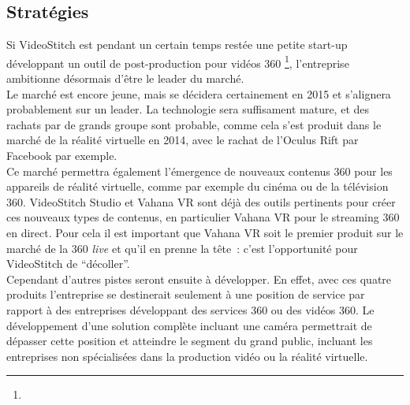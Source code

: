 \subsection{Stratégies}
Si VideoStitch est pendant un certain temps restée une petite start-up développant
un outil de post-production pour vidéos 360 \footnote{}, 
l'entreprise ambitionne désormais d'être le leader du marché.\\
Le marché est encore jeune, mais se décidera certainement en 2015 et s'alignera
probablement sur un leader. La technologie sera suffisament mature, et des rachats
par de grands groupe sont probable, comme cela s'est produit dans le marché de la
réalité virtuelle en 2014, avec le rachat de l'Oculus Rift par Facebook 
\cite{facebook-vr} par exemple.\\
Ce marché permettra également l'émergence de nouveaux contenus 360 pour les appareils
de réalité virtuelle, comme par exemple du cinéma ou de la télévision 360.
VideoStitch Studio et Vahana VR sont déjà des outils pertinents pour créer ces 
nouveaux types de contenus, en particulier Vahana VR pour le streaming 360 en direct.
Pour cela il est important que Vahana VR soit le premier produit sur le marché
de la 360 \textit{live} et qu'il en prenne la tête~: c'est l'opportunité pour VideoStitch
de \enquote{décoller}.\\
\newline
Cependant d'autres pistes seront ensuite à développer. En effet, avec ces quatre produits
l'entreprise se destinerait seulement à une position de service par rapport à des 
entreprises développant des services 360 ou des vidéos 360. Le développement d'une solution complète incluant une 
caméra permettrait de dépasser cette position et atteindre le segment du grand public, incluant
les entreprises non spécialisées dans la production vidéo ou la réalité virtuelle.

